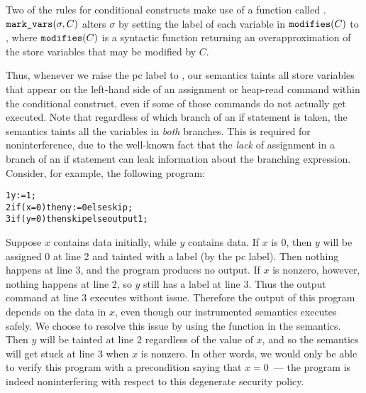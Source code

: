 Two of the rules for conditional constructs make use of a function 
called . $\text{\tt{mark\_vars}}(\sigma, C)$ alters $\sigma$ by setting the label 
of each variable in $\text{\tt{modifies}}(C)$ to \hi{}, where $\text{\tt{modifies}}(C)$ is a 
syntactic function returning an overapproximation of the store variables that may be modified 
by $C$.
\begin{comment}
\begin{align*}
\ttt{modifies}(\skp) & = \emptyset \\
\ttt{modifies}(\out{E}) & = \emptyset \\
\ttt{modifies}(x:=E) & = \{x\} \\
\ttt{modifies}(x:=[E]) & = \{x\} \\
\ttt{modifies}([E]:=E') & = \emptyset \\
\ttt{modifies}(\seq{C_1}{C_2}) & = \ttt{modifies}(C_1) \cup \ttt{modifies}(C_2) \\
\ttt{modifies}(\condfull{B}{C_1}{C_2}) & = \ttt{modifies}(C_1) \cup \ttt{modifies}(C_2) \\
\ttt{modifies}(\while{B}{C}) & = \ttt{modifies}(C)
\end{align*}
\end{comment}
Thus, whenever we raise the pc label to \hi{}, our semantics taints all store variables 
that appear on the left-hand side of an assignment or heap-read command within the 
conditional construct, even if some of those commands do not actually get executed. Note 
that regardless of which branch of an if statement is taken, the semantics taints all the 
variables in \emph{both} branches. This is required for noninterference, due to the 
well-known fact that the \emph{lack} of assignment in a branch of an if statement can 
leak information about the branching expression. Consider, for example, the following program:
\begin{alltt}
1    y := 1;
2    if (x = 0) then y := 0 else skip;
3    if (y = 0) then skip else output 1;
\end{alltt} 
Suppose $x$ contains \hi{} data initially, while $y$ contains \lo{} data.
If $x$ is 0, then $y$ will be assigned 0 at line 2 and tainted with a \hi{} label (by the pc label).
Then nothing happens at line 3, and the program produces no output. If $x$ is nonzero, however, nothing
happens at line 2, so $y$ still has a \lo{} label at line 3. Thus the output command at line 3 executes
without issue. Therefore the output of this program depends on the \hi{} data in $x$, even though our
instrumented semantics executes safely. We choose to resolve this issue by using the 
function in the semantics. Then $y$ will be tainted at line 2 regardless of the value of $x$, and so the
semantics will get stuck at line 3 when $x$ is nonzero. In other words, we would only be able to verify this
program with a precondition saying that $x = 0$~--- the program is indeed noninterfering
with respect to this degenerate security policy.

